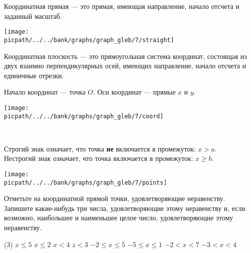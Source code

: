 
\begin{class}[number=1]
	\begin{definit}
	Координатная прямая --- это прямая, имеющая направление, начало отсчета и заданный масштаб.
	\end{definit}
	\begin{minipage}[c]{0.9\linewidth}
		\texttt{[image: \\picpath/../../bank/graphs/graph\_gleb/7/straight]}
	\end{minipage}
	\begin{definit}
		Координатная плоскость --- это прямоугольная система координат, состоящая из двух взаимно перпендикулярных осей, имеющих направление, начало отсчета и единичные отрезки.
	\end{definit}
	\begin{definit}
		Начало координат --- точка \(O\).
		Оси координат --- прямые \(x\) и \(y\).
	\end{definit}
	\begin{minipage}[c]{0.5\linewidth}
		\texttt{[image: \\picpath/../../bank/graphs/graph\_gleb/7/coord]}
	\end{minipage}\\
	\begin{minipage}[c]{0.6\linewidth}
		\begin{definit}
			Строгий знак означает, что точка \textbf{не} включается в промежуток: \(x>a\). \\
			Нестрогий знак означает, что точка включается в промежуток: \(x\ge b\).
		\end{definit}
	\end{minipage}
	\begin{minipage}[c]{0.4\linewidth}
		\texttt{[image: \\picpath/../../bank/graphs/graph\_gleb/7/points]}
	\end{minipage}
	\begin{listofex}
		\item Отметьте на координатной прямой точки, удовлетворяющие неравенству. Запишите какие-нибудь три числа, удовлетворяющие этому неравенству и, если возможно, наибольшее и наименьшее целое число, удовлетворяющие этому неравенству.
		\begin{tasks}(3)
			\task \( x \le 5 \)
			\task \( x \le 2 \)
			\task \( x < 4 \)
			\task \( z<3 \)
			\task \( -2 \le x \le 5 \)
			\task \( -5 \le x \le 1 \)
			\task \( -2 < x < 7 \)
			\task \( -3 < x < 4 \)

\end{tasks}
\end{listofex}
\end{class}
